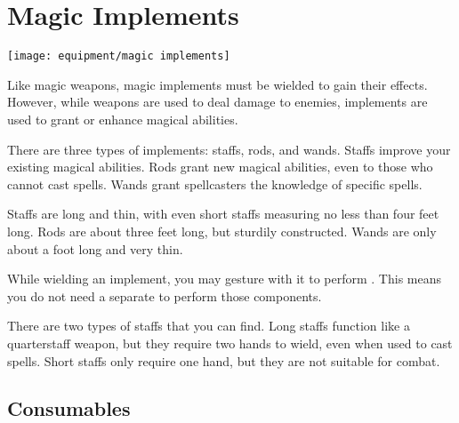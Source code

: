   \newpage
\section{Magic Implements}\label{Magic Implements}
  \texttt{[image: equipment/magic implements]}

  Like magic weapons, magic implements must be wielded to gain their effects.
  However, while weapons are used to deal damage to enemies, implements are used to grant or enhance magical abilities.

  There are three types of implements: staffs, rods, and wands.
  Staffs improve your existing magical abilities.
  Rods grant new magical abilities, even to those who cannot cast spells.
  Wands grant spellcasters the knowledge of specific spells.

  Staffs are long and thin, with even short staffs measuring no less than four feet long.
  Rods are about three feet long, but sturdily constructed.
  Wands are only about a foot long and very thin.

   While wielding an implement, you may gesture with it to perform .
  This means you do not need a separate  to perform those components.

  There are two types of staffs that you can find.
  Long staffs function like a quarterstaff weapon, but they require two hands to wield, even when used to cast spells.
  Short staffs only require one hand, but they are not suitable for combat.

  \begin{longcolumn}
    
  \end{longcolumn}

  

  \begin{longcolumn}
    \section{Consumables}\label{Consumables}

      
  \end{longcolumn}

